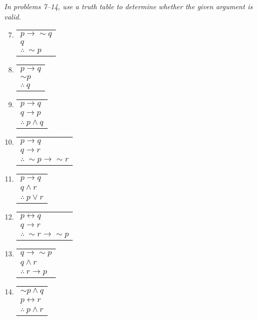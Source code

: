 \emph{In problems 7--14, use a truth table to determine whether the given argument is valid.}
\begin{enumerate}
\setcounter{enumi}{6}

\item 
\begin{tabular}{l}
$p \to \sim q$\\
$q$\\
\hline
$\therefore\ \sim p$
\end{tabular} \text{} 

\item 
\begin{tabular}{l}
$p \to q$\\
$\sim p$\\
\hline
$\therefore\ q$
\end{tabular} \text{} 


\item 
\begin{tabular}{l}
$p \to q$\\
$q \to p$\\
\hline
$\therefore\ p \wedge q$
\end{tabular} \text{} 


\item 
\begin{tabular}{l}
$p \to q$\\
$q \to r$\\
\hline
$\therefore\ \sim p \to \sim r$
\end{tabular} \text{} 


\item 
\begin{tabular}{l}
$p \to q$\\
$q \wedge r$\\
\hline
$\therefore\ p \vee r$
\end{tabular} \text{} 


\item 
\begin{tabular}{l}
$p \leftrightarrow q$\\
$q \to r$\\
\hline
$\therefore\ \sim r \to \sim p$
\end{tabular} \text{} 


\item 
\begin{tabular}{l}
$q \to \sim p$\\
$q \wedge r$\\
\hline
$\therefore\ r \to p$
\end{tabular} \text{} 


\item 
\begin{tabular}{l}
$\sim p \wedge q$\\
$p \leftrightarrow r$\\
\hline
$\therefore\ p \wedge r$
\end{tabular} \text{} 

\end{enumerate}

